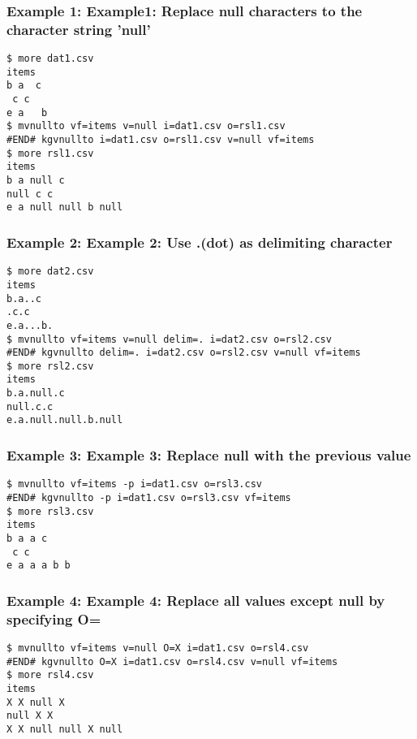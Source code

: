 \subsubsection*{Example 1: Example1: Replace null characters to the character string ’null’}



\begin{Verbatim}[baselinestretch=0.7,frame=single]
$ more dat1.csv
items
b a  c
 c c
e a   b 
$ mvnullto vf=items v=null i=dat1.csv o=rsl1.csv
#END# kgvnullto i=dat1.csv o=rsl1.csv v=null vf=items
$ more rsl1.csv
items
b a null c
null c c
e a null null b null
\end{Verbatim}
\subsubsection*{Example 2: Example 2: Use .(dot) as delimiting character}



\begin{Verbatim}[baselinestretch=0.7,frame=single]
$ more dat2.csv
items
b.a..c
.c.c
e.a...b.
$ mvnullto vf=items v=null delim=. i=dat2.csv o=rsl2.csv
#END# kgvnullto delim=. i=dat2.csv o=rsl2.csv v=null vf=items
$ more rsl2.csv
items
b.a.null.c
null.c.c
e.a.null.null.b.null
\end{Verbatim}
\subsubsection*{Example 3: Example 3: Replace null with the previous value}



\begin{Verbatim}[baselinestretch=0.7,frame=single]
$ mvnullto vf=items -p i=dat1.csv o=rsl3.csv
#END# kgvnullto -p i=dat1.csv o=rsl3.csv vf=items
$ more rsl3.csv
items
b a a c
 c c
e a a a b b
\end{Verbatim}
\subsubsection*{Example 4: Example 4: Replace all values except null by specifying O=}



\begin{Verbatim}[baselinestretch=0.7,frame=single]
$ mvnullto vf=items v=null O=X i=dat1.csv o=rsl4.csv
#END# kgvnullto O=X i=dat1.csv o=rsl4.csv v=null vf=items
$ more rsl4.csv
items
X X null X
null X X
X X null null X null
\end{Verbatim}
